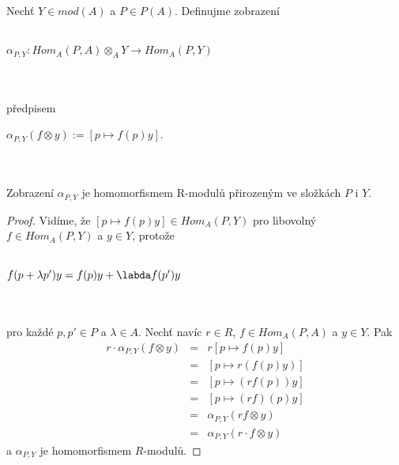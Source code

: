       \begin{lem}\label{lemma-alpha-P-Y}
        Nechť $Y\in mod(A)$ a $P\in P(A)$. Definujme zobrazení\\\\
        \centerline{$\alpha_{P,Y}:Hom_A(P,A)\otimes_A Y\rightarrow Hom_A(P,Y)$} 
        \\\\
        předpisem \\
        \centerline{$\alpha_{P,Y}(f\otimes y):=[p\mapsto f(p)y]$.}\\\\
        Zobrazení $\alpha_{P,Y}$ je homomorfismem R-modulů přirozeným ve 
        složkách $P$ i $Y$.
      \end{lem}
      \begin{proof}
        Vidíme, že $[p\mapsto f(p)y]\in Hom_A(P,Y)$ pro libovolný $f\in Hom_A(P,Y)$ 
        a $y\in Y$, protože \\\\
        \centerline{$f(p+\lambda p')y=f(p)y+\labda f(p')y$} \\\\
        pro každé $p,p'\in P$ a $\lambda\in A$. Nechť navíc $r\in R$, $f\in Hom_A(P,A)$ 
        a $y\in Y$. Pak
        \begin{eqnarray}
          r\cdot \alpha_{P,Y}(f\otimes y)
           &=& r[p\mapsto f(p)y]  \nonumber \\
           &=& [p\mapsto r(f(p)y)]  \nonumber \\
           &=& [p\mapsto (rf(p))y]  \nonumber \\
           &=& [p\mapsto (rf)(p)y]  \nonumber \\
           &=& \alpha_{P,Y}(rf\otimes y)  \nonumber \\
           &=& \alpha_{P,Y}(r\cdot f\otimes y)  \nonumber 
        \end{eqnarray}
        a $\alpha_{P,Y}$ je homomorfismem $R$-modulů.
        

\end{proof}
